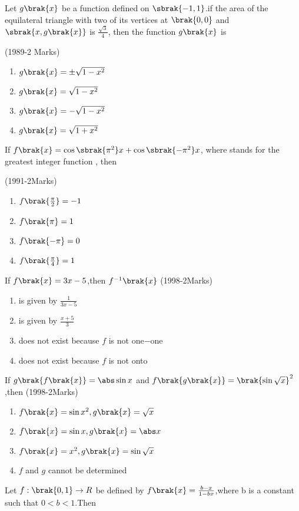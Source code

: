 \iffalse
  \title{FUNCTIONS}
  \author{SRUJANA-EE24BTECH11042}
  \section{mcq-multiple}
\fi
\item Let $g\brak{x}$ be a function defined on $\sbrak{-1,1}$.if the area of the equilateral triangle with two of its vertices at $\brak{0,0}$ and $\sbrak{x,g\brak{x}}$ is $\frac{\sqrt{3}}{4}$, then the function $g\brak{x}$ is

\hfill(1989-2 Marks)
\begin{multicols}{2}
\begin{enumerate} 
\item $g\brak{x}=\pm\sqrt{1-x^2}$ 
\item $g\brak{x}=\sqrt{1-x^2}$
\item $g\brak{x}=-\sqrt{1-x^2}$
\item $g\brak{x}=\sqrt{1+x^2}$
\end{enumerate}
\end{multicols}
\item If $f\brak{x} = \cos\sbrak{\pi^2}x + \cos\sbrak{-\pi^2}x$, where
 stands for the greatest integer function , then  

\hfill(1991-2Marks)
\begin{multicols}{2}
\begin{enumerate} 
\item $f\brak{\frac{\pi}{2}}=-1$
\item $f\brak{\pi}=1$
\item $f\brak{-\pi}=0$
\item $f\brak{\frac{\pi}{4}}=1$
\end{enumerate}
\end{multicols}
\item If $f\brak{x}=3x-5$,then $f^{-1}\brak{x}$
\hfill(1998-2Marks)
\begin{enumerate} 
\item is given by $\frac{1}{3x-5}$
\item is given by $\frac{x+5}{3}$
\item does not exist because $f$ is not one$-$one
\item does not exist because $f$ is not onto 
\end{enumerate}
\item If $g\brak{f\brak{x}}=\abs\sin{x}$ and $f\brak{g\brak{x}}=\brak{\sin{\sqrt{x}}}^2$,then
\hfill(1998-2Marks)
\begin{enumerate} 
\item $f\brak{x}=\sin{x}^2,g\brak{x}=\sqrt{x}$
\item $f\brak{x}=\sin{x},g\brak{x}=\abs x$
\item $f\brak{x}=x^2,g\brak{x}=\sin{\sqrt{x}}$
\item $f$ and $g$ cannot be determined
\end{enumerate}
\item Let $f:\brak{0,1}\rightarrow{R}$ be defined by $f\brak{x}=\frac{b-x}{1-bx}$,where b is a constant such that $0<b<1$.Then

